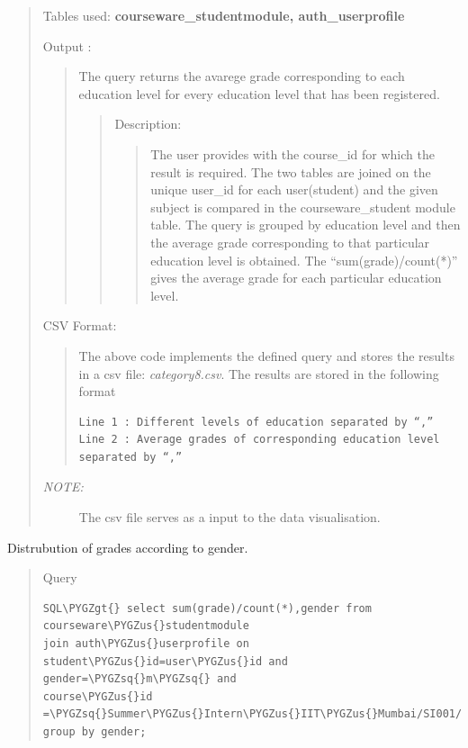 \documentclass[a4paper,12pt,oneside]{sphinxmanual}
\def\PYGZus{\char`\_}
\def\PYGZgt{\char`\>}
\def\PYGZsq{\char`\'}
\begin{document}
\begin{itemize}
\begin{quote}
Tables used: \textbf{courseware\_studentmodule, auth\_userprofile}

Output :
\begin{quote}

The query returns the avarege grade corresponding to each education level for every education level that has been registered.
\begin{quote}

Description:
\begin{quote}

The user provides with the course\_id for which the result is required.
The two tables are joined on the unique user\_id for each user(student) and the given subject is compared in the courseware\_student module table.
The query is grouped by education level and then the average grade corresponding to that particular education level is obtained.
The ``sum(grade)/count(*)'' gives the average grade for each particular education level.
\end{quote}
\end{quote}
\end{quote}

CSV Format:
\begin{quote}

The above code implements the defined query and stores the results in a csv file: \emph{category8.csv}.
The results are stored in the following format

\begin{Verbatim}[commandchars=\\\{\}]
Line 1 : Different levels of education separated by “,”
Line 2 : Average grades of corresponding education level
separated by “,”
\end{Verbatim}
\end{quote}
\begin{description}
\item[{\emph{NOTE:}}] \leavevmode
The csv file serves as a input to the data visualisation.

\end{description}
\end{quote}

Distrubution of grades according to gender.
\begin{quote}

Query

\begin{Verbatim}[commandchars=\\\{\}]
SQL\PYGZgt{} select sum(grade)/count(*),gender from courseware\PYGZus{}studentmodule
join auth\PYGZus{}userprofile on student\PYGZus{}id=user\PYGZus{}id and gender=\PYGZsq{}m\PYGZsq{} and
course\PYGZus{}id =\PYGZsq{}Summer\PYGZus{}Intern\PYGZus{}IIT\PYGZus{}Mumbai/SI001/2014\PYGZus{}SI\PYGZus{}May\PYGZsq{} group by gender;
\end{Verbatim}


\end{quote}
\end{itemize}
\end{document}
